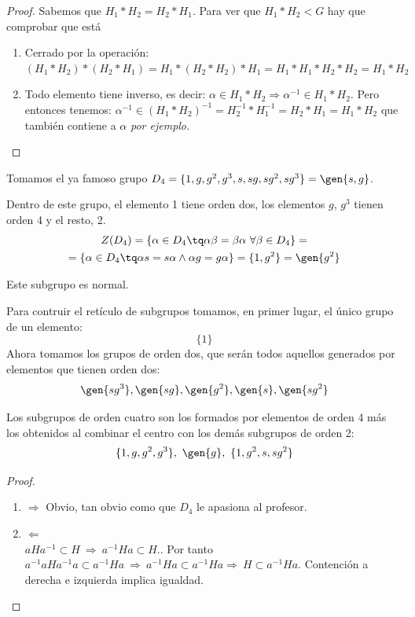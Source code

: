 \documentclass{apuntes}
\begin{document}
 \begin{proof}
  Sabemos que $H_{1}\ast H_{2}=H_{2}\ast H_{1}$. Para ver que $H_{1}\ast H_{2}<G$  hay que comprobar que está
  \begin{enumerate}
   \item Cerrado por la operación: $(H_{1}\ast H_{2})\ast (H_{2}\ast H_{1})=H_{1}\ast (H_{2}\ast H_{2})\ast H_{1}=H_{1}\ast H_{1}\ast H_{2}\ast H_{2}=H_{1}\ast H_{2}$
   \item Todo elemento tiene inverso, es decir: $\alpha\in H_{1}\ast H_{2}\Rightarrow \alpha^{-1}\in H_{1}\ast H_{2}$. Pero entonces tenemos:
   $\alpha^{-1}\in (H_{1}\ast H_{2})^{-1} = H_{2}^{-1}\ast H_{1}^{-1}=H_{2}\ast H_{1}=H_{1}\ast H_{2}$ que también contiene a $\alpha$ \textit{por ejemplo.}
  \end{enumerate}

 \end{proof}

 \begin{example}
  Tomamos el ya famoso grupo $D_{4}=\{1,g,g^{2},g^{3}, s, sg, sg^{2}, sg^{3}\}=\gen{s,g}$.
  
  Dentro de este grupo, el elemento 1 tiene orden dos, los elementos $g$, $g^{3}$  tienen orden 4 y el resto, 2.
  \begin{gather*}
  Z(D_{4})= \{\alpha\in D_{4} \tq \alpha\beta=\beta\alpha \ \forall \beta \in D_{4}\}= \\
  = \{\alpha\in D_{4}\tq \alpha s = s\alpha \wedge \alpha g = g\alpha\}=\{1, g^{2}\}=\gen{g^{2}}
  \end{gather*} 
  
  Este subgrupo es normal.
  
  Para contruir el retículo de subgrupos tomamos, en primer lugar, el único grupo de un elemento: 
  \[ \{1\} \]
  Ahora tomamos los grupos de orden dos, que serán todos aquellos generados por elementos que tienen orden dos:\\
  \[ \gen{sg^{3}}, \gen{sg}, \gen{g^{2}}, \gen{s}, \gen{sg^{2}} \]
  
  Los subgrupos de orden cuatro son los formados por elementos de orden 4 más los obtenidos al combinar el centro con los demás subgrupos de orden 2:
  \[ \{1,g,g^{2},g^{3}\}, \ \gen{g}, \ \{1, g^{2}, s, sg^{2}\} \]
 \end{example}
 

 \begin{proof}
 \begin{enumerate}
  \item $\Rightarrow$  Obvio, tan obvio como que $D_4$ le apasiona al profesor.
  \item $\Leftarrow$\\
  $aHa^{-1} \subset H \ \Rightarrow \ a^{-1}Ha\subset H.$. Por tanto $a^{-1}aHa^{-1}a \subset a^{-1}Ha \ \Rightarrow \ a^{-1}Ha \subset  a^{-1}Ha \Rightarrow \ H \subset a^{-1}Ha$.
  Contención a derecha e izquierda implica igualdad.
 \end{enumerate}
 \end{proof} 
 
\end{document}
